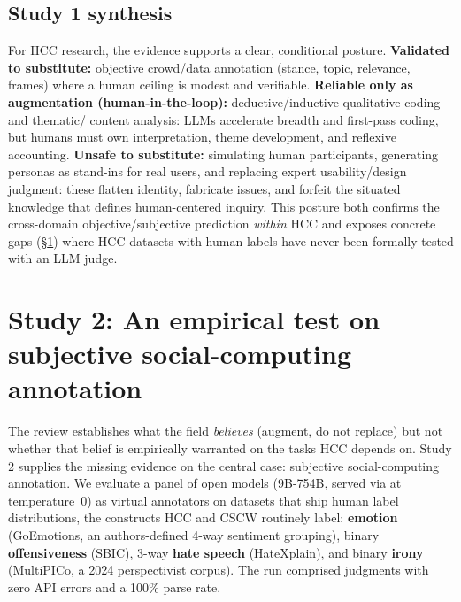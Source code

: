\subsection{Study 1 synthesis}
For HCC research, the evidence supports a clear, conditional posture.
\textbf{Validated to substitute:} objective crowd/data annotation (stance, topic, relevance, frames) where a human
ceiling is modest and verifiable.
\textbf{Reliable only as augmentation (human-in-the-loop):} deductive/inductive qualitative coding and thematic/
content analysis: LLMs accelerate breadth and first-pass coding, but humans must own interpretation, theme
development, and reflexive accounting.
\textbf{Unsafe to substitute:} simulating human participants, generating personas as stand-ins for real users, and
replacing expert usability/design judgment: these flatten identity, fabricate issues, and forfeit the situated
knowledge that defines human-centered inquiry. This posture both confirms the cross-domain objective/subjective prediction
\emph{within} HCC and exposes concrete gaps (\S\ref{sec:study2emp}) where HCC datasets with human labels have never
been formally tested with an LLM judge.

\section{Study 2: An empirical test on subjective social-computing annotation}\label{sec:study2emp}
The review establishes what the field \emph{believes} (augment, do not replace) but not whether that belief is
empirically warranted on the tasks HCC depends on. Study 2 supplies the missing evidence on the central case:
subjective social-computing annotation. We evaluate a panel of \STHRmodels{} open models (9B-754B, served via
\PROVIDER{} at temperature~0) as virtual annotators on \SOCndat{} datasets that ship human label distributions, the
constructs HCC and CSCW routinely label: \textbf{emotion} (GoEmotions, an authors-defined 4-way sentiment grouping),
binary \textbf{offensiveness} (SBIC), 3-way \textbf{hate speech} (HateXplain), and binary \textbf{irony} (MultiPICo,
a 2024 perspectivist corpus). The run comprised \SOCnjudg{} judgments with zero API errors and a 100\% parse rate.

